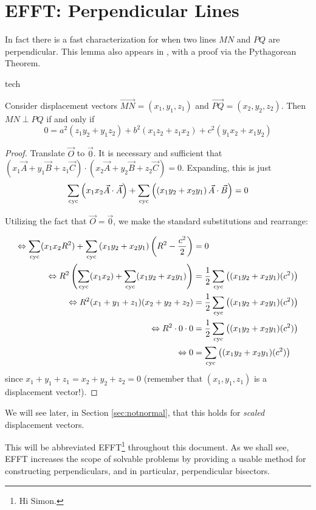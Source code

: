 \section{EFFT: Perpendicular Lines}
In fact there is a fast characterization for when two lines $MN$ and $PQ$ are perpendicular.  This lemma also appears in \cite{book}, with a proof via the Pythagorean Theorem.
\begin{StoreCode}{tech}
\begin{theorem}
  \label{tech:efft}
  Consider displacement vectors $\overrightarrow{MN} = (x_1, y_1, z_1)$ and $\overrightarrow{PQ} = (x_2, y_2, z_2)$.  Then $MN \perp PQ$ if and only if
  \[  0 = a^2(z_1y_2 + y_1z_2) + b^2(x_1z_2 + z_1x_2) + c^2(y_1x_2 + x_1y_2)\]
\end{theorem}
\end{StoreCode}
\begin{proof}
  Translate $\vec O$ to $\vec 0$.  It is necessary and sufficient that $(x_1\vec A + y_1\vec B + z_1 \vec C) \cdot (x_2 \vec A + y_2 \vec B + z_2 \vec C) = 0$.  Expanding, this is just
  \[ \sum_{\text{cyc}} \left(x_1x_2 \vec A \cdot \vec A \right) + \sum_{\text{cyc}} \left( \left(x_1y_2 + x_2y_1\right) \vec A \cdot \vec B \right) = 0 \]

  Utilizing the fact that $\vec O = \vec 0$, we make the standard substitutions and rearrange:

  \begin{align*}
    \Leftrightarrow \sum_{\text{cyc}} (x_1x_2 R^2) + \sum_{\text{cyc}} \left(x_1y_2 + x_2y_1\right)\left(R^2 - \frac{c^2}{2}\right) &= 0 \\
    \Leftrightarrow R^2 \left( \sum_{\text{cyc}} (x_1x_2) + \sum_{\text{cyc}}(x_1y_2 + x_2y_1) \right) &= \frac{1}{2} \sum_{\text{cyc}} \left( (x_1y_2 + x_2y_1)(c^2) \right) \\
    \Leftrightarrow R^2 (x_1 + y_1 + z_1)(x_2 + y_2 + z_2) &= \frac{1}{2} \sum_{\text{cyc}} \left( (x_1y_2 + x_2y_1)(c^2) \right) \\
    \Leftrightarrow R^2 \cdot 0 \cdot 0 &= \frac{1}{2} \sum_{\text{cyc}} \left( (x_1y_2 + x_2y_1)(c^2) \right) \\
    \Leftrightarrow 0 &= \sum_{\text{cyc}} \left( (x_1y_2 + x_2y_1)(c^2) \right)
  \end{align*}
  since $x_1+y_1+z_1 = x_2+y_2+z_2 = 0$ (remember that $(x_1, y_1, z_1)$ is a displacement vector!).
\end{proof}
We will see later, in Section \ref{sec:notnormal}, that this holds for \textit{scaled} displacement vectors.

This will be abbreviated EFFT\footnote{Hi Simon.} throughout this document.  As we shall see, EFFT increases the scope of solvable problems by providing a usable method for constructing perpendiculars, and in particular, perpendicular bisectors.

